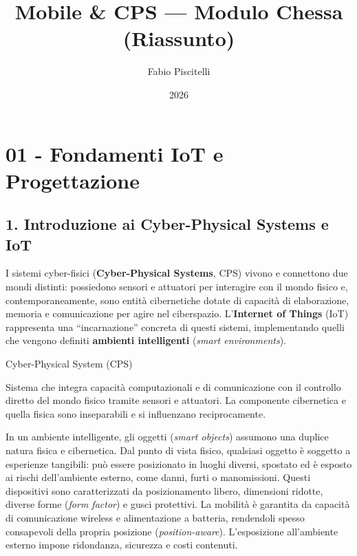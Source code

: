 \documentclass[
  italian,
  openany]{book}
\title{Mobile \& CPS --- Modulo Chessa (Riassunto)}
\author{Fabio Piscitelli}
\date{2026}
\begin{document}
\frontmatter
\maketitle

{
\setcounter{tocdepth}{1}
\tableofcontents
}
\mainmatter
\chapter{01 - Fondamenti IoT e
Progettazione}\label{fondamenti-iot-e-progettazione}

\section{1. Introduzione ai Cyber-Physical Systems e
IoT}\label{introduzione-ai-cyber-physical-systems-e-iot}

I sistemi cyber-fisici (\textbf{Cyber-Physical Systems}, CPS) vivono e
connettono due mondi distinti: possiedono sensori e attuatori per
interagire con il mondo fisico e, contemporaneamente, sono entità
cibernetiche dotate di capacità di elaborazione, memoria e comunicazione
per agire nel ciberspazio. L'\textbf{Internet of Things} (IoT)
rappresenta una ``incarnazione'' concreta di questi sistemi,
implementando quelli che vengono definiti \textbf{ambienti intelligenti}
(\emph{smart environments}).

\begin{calloutdefinition}{Cyber-Physical System (CPS)}

Sistema che integra capacità computazionali e di comunicazione con il
controllo diretto del mondo fisico tramite sensori e attuatori. La
componente cibernetica e quella fisica sono inseparabili e si
influenzano reciprocamente.

\end{calloutdefinition}

In un ambiente intelligente, gli oggetti (\emph{smart objects}) assumono
una duplice natura fisica e cibernetica. Dal punto di vista fisico,
qualsiasi oggetto è soggetto a esperienze tangibili: può essere
posizionato in luoghi diversi, spostato ed è esposto ai rischi
dell'ambiente esterno, come danni, furti o manomissioni. Questi
dispositivi sono caratterizzati da posizionamento libero, dimensioni
ridotte, diverse forme (\emph{form factor}) e gusci protettivi. La
mobilità è garantita da capacità di comunicazione wireless e
alimentazione a batteria, rendendoli spesso consapevoli della propria
posizione (\emph{position-aware}). L'esposizione all'ambiente esterno
impone ridondanza, sicurezza e costi contenuti.
\end{document}
